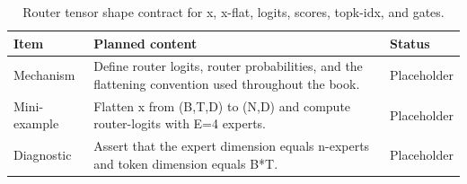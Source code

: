 \begin{table}[H]
\centering
\caption{Router tensor shape contract for x, x-flat, logits, scores, topk-idx, and gates.}
\label{tab:ch03-router-scores-and-tensor-shapes}
\begin{tabularx}{\textwidth}{p{}X p{}}
\toprule
Item & Planned content & Status \\
\midrule
Mechanism & Define router logits, router probabilities, and the flattening convention used throughout the book. & Placeholder \\
Mini-example & Flatten x from (B,T,D) to (N,D) and compute router-logits with E=4 experts. & Placeholder \\
Diagnostic & Assert that the expert dimension equals n-experts and token dimension equals B*T. & Placeholder \\
\bottomrule
\end{tabularx}
\end{table}

